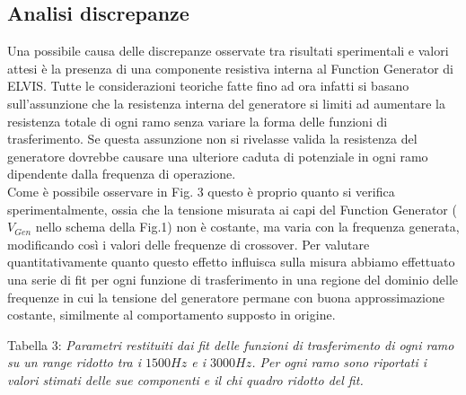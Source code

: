 \documentclass[]{article}
\begin{document}
\subsection{Analisi discrepanze}
Una possibile causa delle discrepanze osservate tra risultati sperimentali e valori attesi è la presenza di una componente resistiva interna al Function Generator di ELVIS. Tutte le considerazioni teoriche fatte fino ad ora infatti si basano sull'assunzione che la resistenza interna del generatore si limiti ad aumentare la resistenza totale di ogni ramo senza variare la forma delle funzioni di trasferimento. Se questa assunzione non si rivelasse valida la resistenza del generatore dovrebbe causare una ulteriore caduta di potenziale in ogni ramo dipendente dalla frequenza di operazione.\\
Come è possibile osservare in Fig. 3 questo è proprio quanto si verifica sperimentalmente, ossia che la tensione misurata ai capi del Function Generator ($V_{Gen}$ nello schema della Fig.1) non è costante, ma varia con la frequenza generata, modificando così i valori delle frequenze di crossover.
Per valutare quantitativamente quanto questo effetto influisca sulla misura abbiamo effettuato una serie di fit per ogni funzione di trasferimento in una regione del dominio delle frequenze in cui la tensione del generatore permane con buona approssimazione costante, similmente al comportamento supposto in origine.\\ 

\begin{center}
	Tabella 3: \emph{Parametri restituiti dai fit delle funzioni di trasferimento di ogni ramo su un range ridotto tra i $1500Hz$ e i $3000Hz$. Per ogni ramo sono riportati i valori stimati delle sue componenti e il chi quadro ridotto del fit.}
\end{center}
\end{document}
